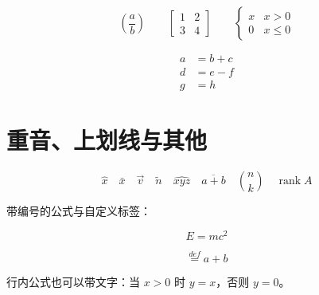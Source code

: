 \[
\left( \frac{a}{b} \right) \qquad \left[ \begin{matrix} 1 & 2 \\ 3 & 4 \end{matrix} \right] \qquad
\begin{cases} x & x > 0 \\ 0 & x \le 0 \end{cases}
\]

\begin{equation}
\begin{aligned}
a &= b + c \\
d &= e - f \\
g &= h
\end{aligned}
\end{equation}

\section{重音、上划线与其他}

\[
\hat{x} \quad \bar{x} \quad \vec{v} \quad \tilde{n} \quad \widehat{xyz} \quad \overline{a+b} \quad \binom{n}{k} \quad \operatorname{rank} A
\]

带编号的公式与自定义标签：

\begin{equation}
E = mc^2
\end{equation}

\begin{equation}
\stackrel{def}{=} a+b
\end{equation}

行内公式也可以带文字：当 $x > 0$ 时 $y = x$，否则 $y = 0$。
